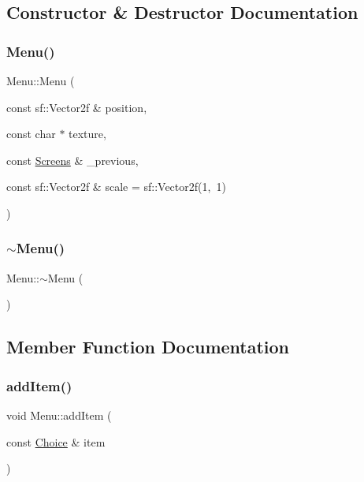 \subsection{Constructor \& Destructor Documentation}
\mbox{\label{class_menu_a0e8556179fdcc650e7f3aa58b05f9f4f}} 
\subsubsection{\texorpdfstring{Menu()}{Menu()}}
{\footnotesize\ttfamily Menu\+::\+Menu (\begin{DoxyParamCaption}\item[{const sf\+::\+Vector2f \&}]{position,  }\item[{const char $\ast$}]{texture,  }\item[{const \hyperlink{_globals_8h_a3d5776bab98402b03be09156bacf4f68}{Screens} \&}]{\+\_\+previous,  }\item[{const sf\+::\+Vector2f \&}]{scale = {\ttfamily sf\+:\+:Vector2f(1,~1)} }\end{DoxyParamCaption})}

\mbox{\label{class_menu_a831387f51358cfb88cd018e1777bc980}} 
\subsubsection{\texorpdfstring{$\sim$\+Menu()}{~Menu()}}
{\footnotesize\ttfamily Menu\+::$\sim$\+Menu (\begin{DoxyParamCaption}{ }\end{DoxyParamCaption})\hspace{0.3cm}{\ttfamily [virtual]}}



\subsection{Member Function Documentation}
\mbox{\label{class_menu_aa8032782ee75fba5fa17bf7a20635c68}} 
\subsubsection{\texorpdfstring{add\+Item()}{addItem()}}
{\footnotesize\ttfamily void Menu\+::add\+Item (\begin{DoxyParamCaption}\item[{const \hyperlink{class_choice}{Choice} \&}]{item }\end{DoxyParamCaption})\hspace{0.3cm}{\ttfamily [virtual]}}

